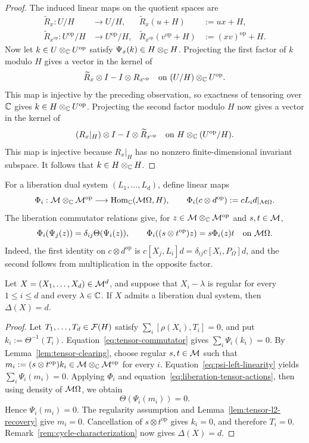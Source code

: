 \begin{proof}
The induced linear maps on the quotient spaces are
\[
 \begin{aligned}
 \widetilde R_x:U/H&\longrightarrow U/H,&
 \widetilde R_x(u+H)&:=ux+H,\\
 \widetilde R_{x^{\mathrm{op}}}:U^{\mathrm{op}}/H&\longrightarrow U^{\mathrm{op}}/H,&
 \widetilde R_{x^{\mathrm{op}}}(v^{\mathrm{op}}+H)&:=(xv)^{\mathrm{op}}+H.
 \end{aligned}
\]
Now let $k\in U\otimes_{\mathbb C}U^{\mathrm{op}}$ satisfy $\Psi_x(k)\in H\otimes_{\mathbb C}H$.
Projecting the first factor of $k$ modulo $H$ gives a vector in the kernel of
\[
 \widetilde R_x\otimes I-I\otimes R_{x^{\mathrm{op}}}
 \quad\text{on }(U/H)\otimes_{\mathbb C}U^{\mathrm{op}}.
\]
This map is injective by the preceding observation, so exactness of tensoring over $\mathbb C$ gives $k\in H\otimes_{\mathbb C}U^{\mathrm{op}}$.
Projecting the second factor modulo $H$ now gives a vector in the kernel of
\[
 (R_x|_H)\otimes I-I\otimes\widetilde R_{x^{\mathrm{op}}}
 \quad\text{on }H\otimes_{\mathbb C}(U^{\mathrm{op}}/H).
\]
This map is injective because $R_x|_H$ has no nonzero finite-dimensional invariant subspace.
It follows that $k\in H\otimes_{\mathbb C}H$.
\end{proof}

For a liberation dual system $(L_1,\ldots,L_d)$, define linear maps
\[
 \Phi_i:\mathcal M\otimes_{\mathbb C}\mathcal M^{\mathrm{op}}
 \longrightarrow\operatorname{Hom}_{\mathbb C}(\mathcal M\Omega,H),\qquad
 \Phi_i(c\otimes d^{\mathrm{op}}):=cL_id|_{\mathcal M\Omega}.
\]
The liberation commutator relations give, for $z\in\mathcal M\otimes_{\mathbb C}\mathcal M^{\mathrm{op}}$ and $s,t\in\mathcal M$,
\begin{equation}\label{eq:liberation-tensor-actions}
 \Phi_i(\Psi_j(z))=\delta_{ij}\Theta(\Psi_i(z)),
 \qquad
 \Phi_i((s\otimes t^{\mathrm{op}})z)=s\Phi_i(z)t
 \quad\text{on }\mathcal M\Omega.
\end{equation}
Indeed, the first identity on $c\otimes d^{\mathrm{op}}$ is $c[X_j,L_i]d=\delta_{ij}c[X_i,P_\Omega]d$, and the second follows from multiplication in the opposite factor.

\begin{proposition}\label{prop:liberation-delta}
Let $X=(X_1,\ldots,X_d)\in\mathcal M^d$, and suppose that $X_i-\lambda$ is regular for every $1\leq i\leq d$ and every $\lambda\in\mathbb C$.
If $X$ admits a liberation dual system, then $\Delta(X)=d$.
\end{proposition}
\begin{proof}
Let $T_1,\ldots,T_d\in\mathcal F(H)$ satisfy $\sum_i[\rho(X_i),T_i]=0$, and put $k_i:=\Theta^{-1}(T_i)$.
Equation~\eqref{eq:tensor-commutator} gives $\sum_i\Psi_i(k_i)=0$.
By Lemma~\ref{lem:tensor-clearing}, choose regular $s,t\in\mathcal M$ such that $m_i:=(s\otimes t^{\mathrm{op}})k_i\in\mathcal M\otimes_{\mathbb C}\mathcal M^{\mathrm{op}}$ for every $i$.
Equation~\eqref{eq:psi-left-linearity} yields $\sum_i\Psi_i(m_i)=0$.
Applying $\Phi_i$ and equation~\eqref{eq:liberation-tensor-actions}, then using density of $\mathcal M\Omega$, we obtain
\[
 \Theta(\Psi_i(m_i))=0.
\]
Hence $\Psi_i(m_i)=0$.
The regularity assumption and Lemma~\ref{lem:tensor-l2-recovery} give $m_i=0$.
Cancellation of $s\otimes t^{\mathrm{op}}$ gives $k_i=0$, and therefore $T_i=0$.
Remark~\ref{rem:cycle-characterization} now gives $\Delta(X)=d$.
\end{proof}

